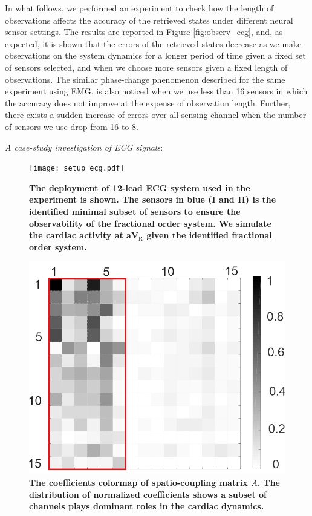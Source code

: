 In what follows, we performed an experiment to check how the length of observations affects the accuracy of the retrieved states under different neural sensor settings. The results are reported in Figure \ref{fig:observ_ecg}, and, as expected, it is shown that the errors of the retrieved states decrease as  we make observations on the system dynamics for a longer period of time given a fixed set of sensors selected, and when we choose more sensors given a fixed length of observations. The similar phase-change phenomenon described for the same experiment using EMG, is also noticed when we use less than 16 sensors in which the accuracy does not improve at the expense of observation length. Further, there exists a sudden increase of errors over all sensing channel when the number of sensors we use drop from 16 to 8.


\textit{A case-study investigation of ECG signals}:
\begin{figure}[!htb]
\centering
\texttt{[image: setup\_ecg.pdf]}
\caption{\textbf{The deployment of 12-lead ECG system used in the experiment is shown. The sensors in blue (I and II) is the identified  minimal subset of sensors to ensure the observability of the fractional order system. We simulate the cardiac activity at aV$_{\text{R}}$ given the identified fractional order system. }}\label{fig:ECG_exp}
\vskip -4mm
\end{figure}   
\begin{figure}[!htb]
\centering
\includegraphics[width=0.85\columnwidth]{sparsity_ecg.png}
\caption{\textbf{The coefficients colormap of spatio-coupling matrix $A$. The distribution of normalized coefficients shows a subset of channels plays dominant roles in the cardiac dynamics. }}\label{fig:ECG_colormap}
\vskip -6mm
\end{figure}  

